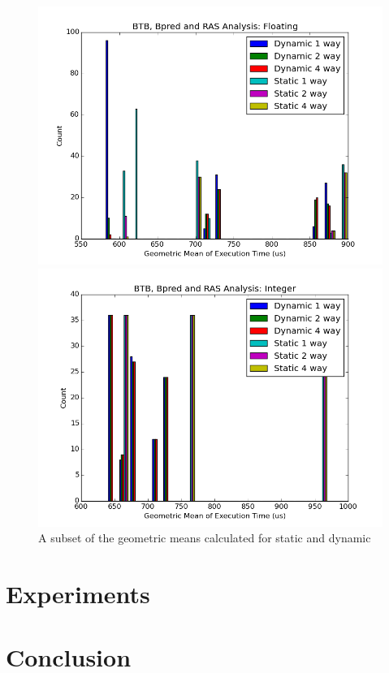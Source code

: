 \documentclass[paper=a4, fontsize=12pt]{scrartcl} %
\numberwithin{equation}{section} %
\numberwithin{figure}{section} %
\numberwithin{table}{section} %
\begin{document}
\begin{figure}
\centering
\begin{minipage}{0.5\textwidth}
\centering
	\includegraphics[width=\linewidth]{graphs/Bpred_RAS_BTB/BTB_Bpred_and_RAS_Analysis_Floating.png}
\end{minipage}\hfill
\begin{minipage}{0.5\textwidth}
\centering
 \includegraphics[width=\linewidth]{graphs/Bpred_RAS_BTB/BTB_Bpred_and_RAS_Analysis_Integer.png}
\end{minipage}

\caption{A subset of the geometric means calculated for static and dynamic }
\label{fig:tlb}
\end{figure}


\section{Experiments}



\section{Conclusion}
\end{document}

